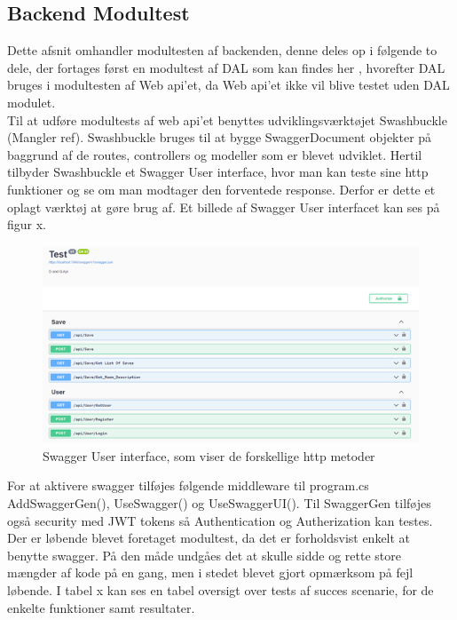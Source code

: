 \subsection{Backend Modultest}

Dette afsnit omhandler modultesten af backenden, denne deles op i følgende to dele, der fortages først en modultest af DAL som kan findes her , hvorefter DAL bruges i modultesten af Web api’et, da Web api’et ikke vil blive testet uden DAL modulet.\\

Til at udføre modultests af web api’et benyttes udviklingsværktøjet Swashbuckle (Mangler ref). Swashbuckle bruges til at bygge SwaggerDocument objekter på baggrund af de routes, controllers og modeller som er blevet udviklet. Hertil tilbyder Swashbuckle et Swagger User interface, hvor man kan teste sine http funktioner og se om man modtager den forventede response. Derfor er dette et oplagt værktøj at gøre brug af. Et billede af Swagger User interfacet kan ses på figur x.\\

\begin{figure}[H]
\centering
\includegraphics[width = \textwidth]{02-Body/Images/Backend_swagger.PNG}
\caption{Swagger User interface, som viser de forskellige http metoder}
\label{fig:Modultest-Backend-swagger}
\end{figure}

For at aktivere swagger tilføjes følgende middleware til program.cs AddSwaggerGen(), UseSwagger() og UseSwaggerUI(). Til SwaggerGen tilføjes også security med JWT tokens så Authentication og Autherization kan testes.\\

Der er løbende blevet foretaget modultest, da det er forholdsvist enkelt at benytte swagger. På den måde undgåes det at skulle sidde og rette store mængder af kode på en gang, men i stedet blevet gjort opmærksom på fejl løbende. I tabel x kan ses en tabel oversigt over tests af succes scenarie, for de enkelte funktioner samt resultater.\\


